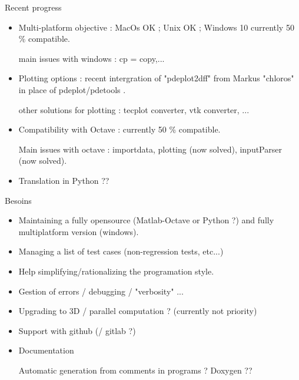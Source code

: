 \documentclass{beamer}
\begin{document}
\begin{frame}{Recent progress}

\begin{itemize}

\item Multi-platform objective : 
MacOs OK ; Unix OK ; Windows 10 currently 50 \% compatible.

{\small main issues with windows : cp = copy,...}%

\item Plotting options : recent intergration of "pdeplot2dff" from Markus "chloros" in place of pdeplot/pdetools .

{\small other solutions for plotting : tecplot converter, vtk converter, ...}

\item Compatibility with Octave : currently 50 \% compatible.

{\small Main issues with octave : importdata, plotting (now solved), inputParser (now solved)}.

\item Translation in Python  ??

\end{itemize}

\end{frame}




\begin{frame}{Besoins}

\begin{itemize}

\item Maintaining a fully opensource  (Matlab-Octave or Python ?) and fully multiplatform version (windows).

\item Managing a list of test cases (non-regression tests, etc...)

\item Help simplifying/rationalizing the programation style.

\item Gestion of errors / debugging / "verbosity" ...

\item Upgrading to 3D / parallel computation ? (currently not priority)

\item Support with github  (/ gitlab ?)

\item Documentation 

Automatic generation from comments in programs ?  Doxygen ??


\end{itemize}


\end{frame}
\end{document}
